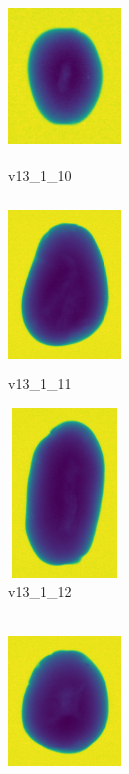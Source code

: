 \documentclass[11pt]{article}
\begin{document}
\begin{figure}
          \begin{subfigure}[b]{0.15\textwidth}
         \centering
         \includegraphics[width=3cm, height=4.5cm]{images/kartofler/v13_1_10_cut.png}
         \caption{v13\_1\_10}
         \label{fig:y equals x}
     \end{subfigure}
     \hfill
     \begin{subfigure}[b]{0.15\textwidth}
         \centering
         \includegraphics[width=3cm, height=4.5cm]{images/kartofler/v13_1_11_cut.png}
        \caption{v13\_1\_11}
         \label{fig:three sin x}
     \end{subfigure}
     \hfill
     \begin{subfigure}[b]{0.15\textwidth}
         \centering
         \includegraphics[width=3cm, height=4.5cm]{images/kartofler/v13_1_12_cut.png}
        \caption{v13\_1\_12}
         \label{fig:five over x}
     \end{subfigure}
     \hfill
    \begin{subfigure}[b]{0.15\textwidth}
         \centering
         \includegraphics[width=3cm, height=4.5cm]{images/kartofler/v13_1_13_cut.png}

\end{subfigure}
\end{figure}
\end{document}
